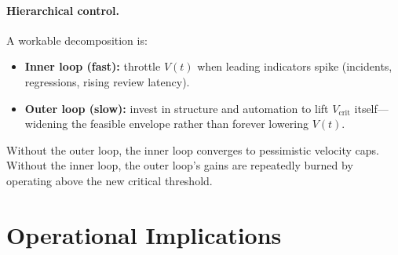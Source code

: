 \documentclass[11pt]{article}
\begin{document}
\paragraph{Hierarchical control.}
A workable decomposition is:
\begin{itemize}
    \item \textbf{Inner loop (fast):} throttle $V(t)$ when leading indicators spike (incidents, regressions, rising review latency).
    \item \textbf{Outer loop (slow):} invest in structure and automation to lift $V_{\text{crit}}$ itself---widening the feasible envelope rather than forever lowering $V(t)$.
\end{itemize}

Without the outer loop, the inner loop converges to pessimistic velocity caps. Without the inner loop, the outer loop's gains are repeatedly burned by operating above the new critical threshold.

\section{Operational Implications}
\end{document}

